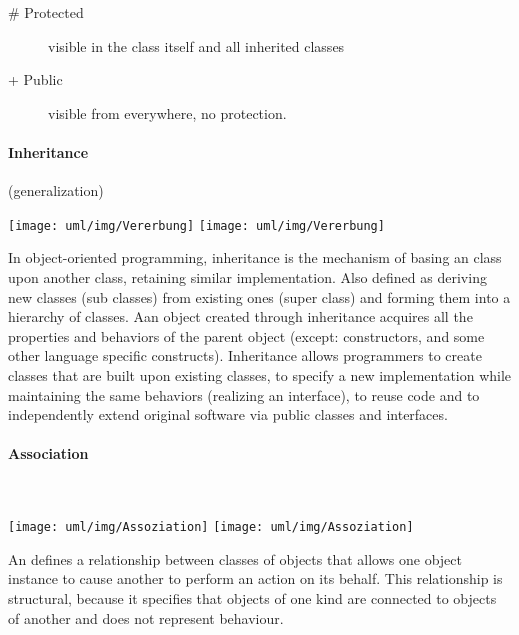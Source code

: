 \begin{minipage}[c]{0.45\linewidth}
\begin{minipage}[c]{0.58\linewidth}
\begin{description}
\item [\# Protected] visible in the class itself and all inherited classes

\item [+ Public] visible from everywhere, no protection.
\end{description}
\end{minipage}

\newpage
\paragraph{Inheritance} (generalization)\\[2ex]
\begin{minipage}[c]{0.5\linewidth}
\ifslides
\texttt{[image: uml/img/Vererbung]}
\else
\texttt{[image: uml/img/Vererbung]}
\fi
\end{minipage}
\begin{minipage}[c]{0.45\linewidth}

In object-oriented programming, inheritance is the mechanism of basing an
class upon another class, retaining similar implementation. Also defined as
deriving new classes (sub classes) from existing ones (super class)
and forming them into a hierarchy of classes. Aan object created through
inheritance acquires all the properties and behaviors of the parent
object (except: constructors, and some other language specific constructs).
Inheritance allows programmers to create classes
that are built upon existing classes, to specify a new implementation while
maintaining the same behaviors (realizing an interface), to reuse code and to
independently extend original software via public classes and interfaces.
\end{minipage}
%
\newpage
\paragraph{Association}\mbox{} \\
\begin{minipage}[c]{0.28\linewidth}
\ifslides
\texttt{[image: uml/img/Assoziation]}
\else
\texttt{[image: uml/img/Assoziation]}
\fi
\end{minipage}
\begin{minipage}[c]{0.7\linewidth}
An  defines a relationship between classes of
objects that allows one object instance to cause another to perform an action
on its behalf. This relationship is structural, because it specifies that
objects of one kind are connected to objects of another and does not
represent behaviour.
\end{minipage}
%
\ifslides
\newpage
\fi

\end{minipage}
